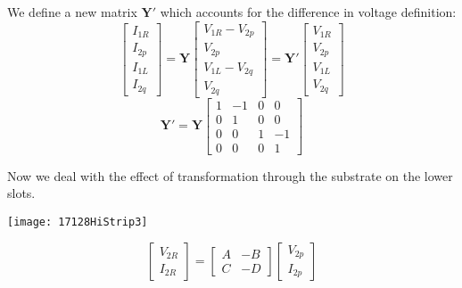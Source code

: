 \documentclass{article}
\begin{document}
We define a new matrix $\mathbf{Y'}$ which accounts for the difference in voltage definition:
\begin{equation}
	\begin{bmatrix}I_{1R}\\ I_{2p}\\I_{1L}\\I_{2q}\end{bmatrix} = \mathbf{Y} \begin{bmatrix}V_{1R}-V_{2p} \\ V_{2p}\\V_{1L}-V_{2q}\\V_{2q}\end{bmatrix} = \mathbf{Y'}\begin{bmatrix}V_{1R} \\ V_{2p}\\V_{1L}\\V_{2q}\end{bmatrix}
\end{equation}
\begin{equation}
	\mathbf{Y'}=\mathbf{Y}\begin{bmatrix}1 & -1 & 0 & 0\\ 0 & 1 & 0 & 0 \\ 0 & 0 & 1 & -1\\ 0 & 0 & 0& 1\end{bmatrix}
\end{equation}

Now we deal with the effect of transformation through the substrate on the lower slots. 

\begin{center}
\centerline{\texttt{[image: 17128HiStrip3]}}
\end{center}




\begin{equation}
	\begin{bmatrix}V_{2R}\\I_{2R}\end{bmatrix} = \begin{bmatrix}A & -B\\C&-D\end{bmatrix}\begin{bmatrix}V_{2p}\\I_{2p}\end{bmatrix}
\end{equation}
\end{document}
